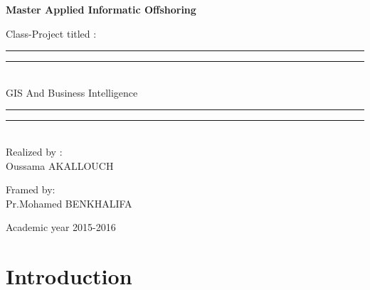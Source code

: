 \documentclass[12pt]{extreport}
\begin{document}

 
\thispagestyle{empty}
\begin{center}


\vspace*{1cm}

 
\LARGE
\textbf{Master Applied Informatic Offshoring}

\bigskip
 

 

\Large
Class-Project titled :




\centering %

\rule{\textwidth}{1.6pt}\vspace*{-\baselineskip}\vspace*{2pt} %
\rule{\textwidth}{0.4pt}\\[\baselineskip] %

{\LARGE GIS And Business Intelligence}\\[0.2\baselineskip] %

\rule{\textwidth}{0.4pt}\vspace*{-\baselineskip}\vspace{3.2pt} %
\rule{\textwidth}{1.6pt}\\[\baselineskip] %


Realized by :\\ 

Oussama AKALLOUCH

\bigskip

\bigskip

Framed by:\\

Pr.Mohamed BENKHALIFA


\vspace{4 cm}

Academic year 2015-2016

\normalsize

\end{center}









 

 

 



 \lhead{\leftmark }
\rhead{}

\tableofcontents
\listoffigures
 
\chapter{Introduction}
\end{document}
